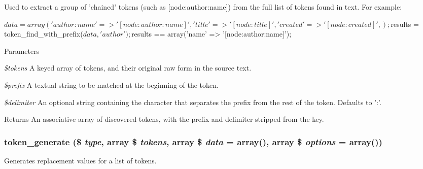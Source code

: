 Used to extract a group of 'chained' tokens (such as \mbox{[}node:author:name\mbox{]}) from the full list of tokens found in text. For example: 
\begin{DoxyCode}
   $data = array(
     'author:name' => '[node:author:name]',
     'title'       => '[node:title]',
     'created'     => '[node:created]',
   );
   $results = token_find_with_prefix($data, 'author');
   $results == array('name' => '[node:author:name]');
\end{DoxyCode}



\begin{DoxyParams}{Parameters}
\item[{\em \$tokens}]A keyed array of tokens, and their original raw form in the source text. \item[{\em \$prefix}]A textual string to be matched at the beginning of the token. \item[{\em \$delimiter}]An optional string containing the character that separates the prefix from the rest of the token. Defaults to ':'.\end{DoxyParams}
\begin{DoxyReturn}{Returns}
An associative array of discovered tokens, with the prefix and delimiter stripped from the key. 
\end{DoxyReturn}
\hypertarget{includes_2token_8inc_abcd5ba5a75b47fe97338243a62d4eecd}{
\subsubsection[{token\_\-generate}]{\setlength{\rightskip}{0pt plus 5cm}token\_\-generate (\$ {\em type}, \/  array \$ {\em tokens}, \/  array \$ {\em data} = {\ttfamily array()}, \/  array \$ {\em options} = {\ttfamily array()})}}
\label{includes_2token_8inc_abcd5ba5a75b47fe97338243a62d4eecd}
Generates replacement values for a list of tokens.


